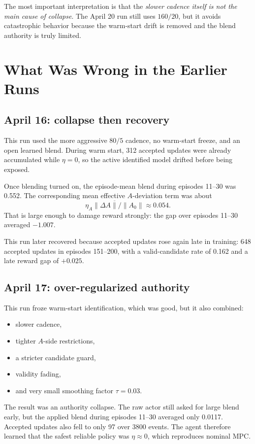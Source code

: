 \documentclass[11pt]{article}
\begin{document}
The most important interpretation is that the \emph{slower cadence itself is not the main cause of collapse}. The April 20 run still uses $160/20$, but it avoids catastrophic behavior because the warm-start drift is removed and the blend authority is truly limited.

\section*{What Was Wrong in the Earlier Runs}
\subsection*{April 16: collapse then recovery}
This run used the more aggressive $80/5$ cadence, no warm-start freeze, and an open learned blend. During warm start, 312 accepted updates were already accumulated while $\eta=0$, so the active identified model drifted before being exposed.

Once blending turned on, the episode-mean blend during episodes 11--30 was 0.552. The corresponding mean effective $A$-deviation term was about
\[
\overline{\eta_A\lVert \Delta A \rVert/\lVert A_0 \rVert} \approx 0.054.
\]
That is large enough to damage reward strongly: the gap over episodes 11--30 averaged $-1.007$.

This run later recovered because accepted updates rose again late in training: 648 accepted updates in episodes 151--200, with a valid-candidate rate of 0.162 and a late reward gap of $+0.025$.

\subsection*{April 17: over-regularized authority}
This run froze warm-start identification, which was good, but it also combined:
\begin{itemize}
\item slower cadence,
\item tighter $A$-side restrictions,
\item a stricter candidate guard,
\item validity fading,
\item and very small smoothing factor $\tau=0.03$.
\end{itemize}

The result was an authority collapse. The raw actor still asked for large blend early, but the applied blend during episodes 11--30 averaged only 0.0117. Accepted updates also fell to only 97 over 3800 events. The agent therefore learned that the safest reliable policy was $\eta \approx 0$, which reproduces nominal MPC.
\end{document}
